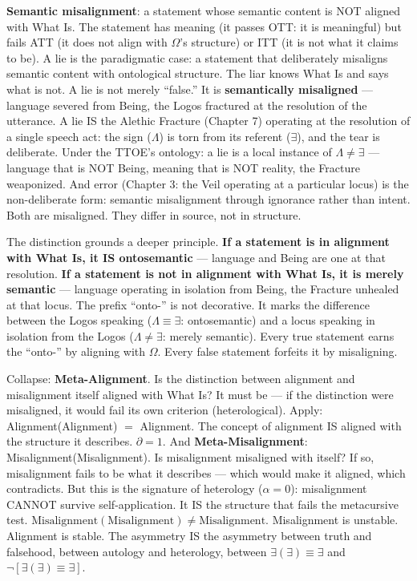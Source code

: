 \documentclass[10pt, openany, oneside]{book}
\begin{document}
\textbf{Semantic misalignment}: a statement whose semantic content is NOT aligned with What Is. The statement has meaning (it passes OTT: it is meaningful) but fails ATT (it does not align with $\Omega$'s structure) or ITT (it is not what it claims to be). A lie is the paradigmatic case: a statement that deliberately misaligns semantic content with ontological structure. The liar knows What Is and says what is not. A lie is not merely ``false.'' It is \textbf{semantically misaligned} --- language severed from Being, the Logos fractured at the resolution of the utterance. A lie IS the Alethic Fracture (Chapter 7) operating at the resolution of a single speech act: the sign ($\Lambda$) is torn from its referent ($\exists$), and the tear is deliberate. Under the TTOE's ontology: a lie is a local instance of $\Lambda \neq \exists$ --- language that is NOT Being, meaning that is NOT reality, the Fracture weaponized. And error (Chapter 3: the Veil operating at a particular locus) is the non-deliberate form: semantic misalignment through ignorance rather than intent. Both are misaligned. They differ in source, not in structure.

The distinction grounds a deeper principle. \textbf{If a statement is in alignment with What Is, it IS ontosemantic} --- language and Being are one at that resolution. \textbf{If a statement is not in alignment with What Is, it is merely semantic} --- language operating in isolation from Being, the Fracture unhealed at that locus. The prefix ``onto-'' is not decorative. It marks the difference between the Logos speaking ($\Lambda \equiv \exists$: ontosemantic) and a locus speaking in isolation from the Logos ($\Lambda \neq \exists$: merely semantic). Every true statement earns the ``onto-'' by aligning with $\Omega$. Every false statement forfeits it by misaligning.

Collapse: \textbf{Meta-Alignment}. Is the distinction between alignment and misalignment itself aligned with What Is? It must be --- if the distinction were misaligned, it would fail its own criterion (heterological). Apply: Alignment(Alignment) $=$ Alignment. The concept of alignment IS aligned with the structure it describes. $\partial = 1$. And \textbf{Meta-Misalignment}: Misalignment(Misalignment). Is misalignment misaligned with itself? If so, misalignment fails to be what it describes --- which would make it aligned, which contradicts. But this is the signature of heterology ($\alpha = 0$): misalignment CANNOT survive self-application. It IS the structure that fails the metacursive test. $\text{Misalignment}(\text{Misalignment}) \neq \text{Misalignment}$. Misalignment is unstable. Alignment is stable. The asymmetry IS the asymmetry between truth and falsehood, between autology and heterology, between $\exists(\exists) \equiv \exists$ and $\neg[\exists(\exists) \equiv \exists]$.
\end{document}
